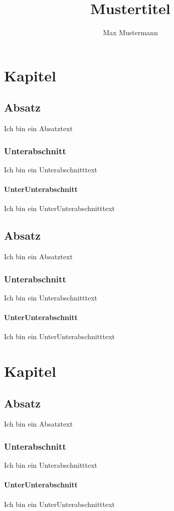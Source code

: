 \documentclass[bachinf,german, hyperref,lof,lot]{zihpub}
\author{Max Mustermann}
\title{Mustertitel}
\begin{document}
\chapter{Kapitel}
\section{Absatz}
Ich bin ein Absatztext
\subsection{Unterabschnitt}
Ich bin ein Unterabschnitttext
\subsubsection{UnterUnterabschnitt}
Ich bin ein UnterUnterabschnitttext

\section{Absatz}
Ich bin ein Absatztext
\subsection{Unterabschnitt}
Ich bin ein Unterabschnitttext
\subsubsection{UnterUnterabschnitt}
Ich bin ein UnterUnterabschnitttext

\chapter{Kapitel}
\section{Absatz}
Ich bin ein Absatztext
\subsection{Unterabschnitt}
Ich bin ein Unterabschnitttext
\subsubsection{UnterUnterabschnitt}
Ich bin ein UnterUnterabschnitttext
\end{document}
